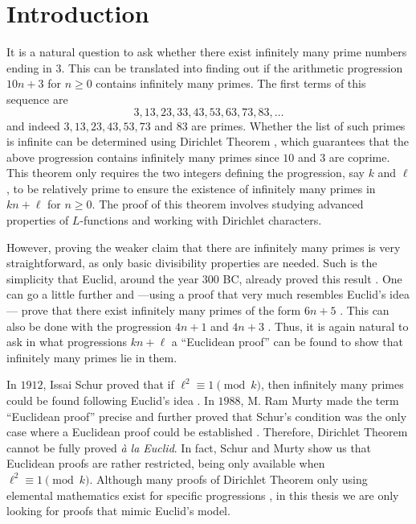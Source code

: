 \documentclass[../main.tex]{subfiles}
\begin{document}
\section{Introduction}\label{sec:intro}
It is a natural question to ask whether there exist infinitely many prime numbers ending in $3$. This can be translated into finding out if the arithmetic progression $10n+3$ for $n\geqslant 0$ contains infinitely many primes. The first terms of this sequence are 
\begin{equation*}
	3, 13, 23, 33, 43, 53, 63, 73, 83,\dots
\end{equation*}
and indeed $3, 13, 23, 43, 53, 73$ and $83$ are primes. Whether the list of such primes is infinite can be determined using Dirichlet Theorem \cite{Dirichlet}, which guarantees that the above progression contains infinitely many primes since $10$ and $3$ are coprime. This theorem only requires the two integers defining the progression, say $k$ and $\ell$, to be relatively prime to ensure the existence of infinitely many primes in $kn+\ell$ for $n\geqslant 0$. The proof of this theorem involves studying advanced properties of $L$-functions and working with Dirichlet characters.

However, proving the weaker claim that there are infinitely many primes is very straightforward, as only basic divisibility properties are needed. Such is the simplicity that Euclid, around the year $300$ BC, already proved this result \cite{Euclid}. One can go a little further and ---using a proof that very much resembles Euclid's idea--- prove that there exist infinitely many primes of the form $6n+5$ \cite{Hardy}. This can also be done with the progression $4n+1$ and $4n+3$ \cite{Lebesgue}. Thus, it is again natural to ask in what progressions $kn+\ell$ a ``Euclidean proof'' can be found to show that infinitely many primes lie in them. 

In $1912$, Issai Schur proved that if $\ell^2\equiv 1 \pmod{k}$, then infinitely many primes could be found following Euclid's idea \cite{Schur}. In $1988$, M. Ram Murty made the term ``Euclidean proof'' precise and further proved that Schur's condition was the only case where a Euclidean proof could be established \cite{Murty}. Therefore, Dirichlet Theorem cannot be fully proved \textit{à la Euclid}. In fact, Schur and Murty show us that Euclidean proofs are rather restricted, being only available when $\ell^2\equiv 1\pmod{k}$. Although many proofs of Dirichlet Theorem only using elemental mathematics exist for specific progressions \cite{GueronTessler, XianzuLin, Selberg, Mestrovic}, in this thesis we are only looking for proofs that mimic Euclid's model.
\end{document}
